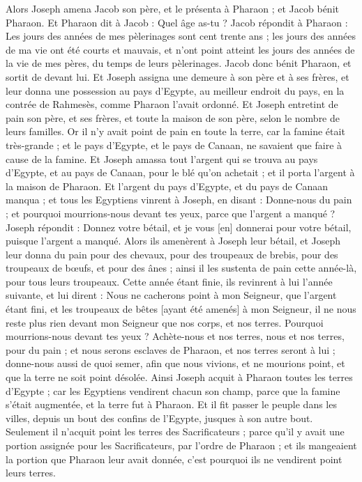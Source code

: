 \begin{multicols}{2}
Alors Joseph amena Jacob son père, et le présenta à Pharaon ; et Jacob bénit Pharaon.
Et Pharaon dit à Jacob : Quel âge as-tu ?
Jacob répondit à Pharaon : Les jours des années de mes pèlerinages sont cent trente ans ; les jours des années de ma vie ont été courts et mauvais, et n'ont point atteint les jours des années de la vie de mes pères, du temps de leurs pèlerinages.
Jacob donc bénit Pharaon, et sortit de devant lui.
Et Joseph assigna une demeure à son père et à ses frères, et leur donna une possession au pays d'Egypte, au meilleur endroit du pays, en la contrée de Rahmesès, comme Pharaon l'avait ordonné.
Et Joseph entretint de pain son père, et ses frères, et toute la maison de son père, selon le nombre de leurs familles.
Or il n'y avait point de pain en toute la terre, car la famine était très-grande ; et le pays d'Egypte, et le pays de Canaan, ne savaient que faire à cause de la famine.
Et Joseph amassa tout l'argent qui se trouva au pays d'Egypte, et au pays de Canaan, pour le blé qu'on achetait ; et il porta l'argent à la maison de Pharaon.
Et l'argent du pays d'Egypte, et du pays de Canaan manqua ; et tous les Egyptiens vinrent à Joseph, en disant : Donne-nous du pain ; et pourquoi mourrions-nous devant tes yeux, parce que l'argent a manqué ?
Joseph répondit : Donnez votre bétail, et je vous [en] donnerai pour votre bétail, puisque l'argent a manqué.
Alors ils amenèrent à Joseph leur bétail, et Joseph leur donna du pain pour des chevaux, pour des troupeaux de brebis, pour des troupeaux de bœufs, et pour des ânes ; ainsi il les sustenta de pain cette année-là, pour tous leurs troupeaux.
Cette année étant finie, ils revinrent à lui l'année suivante, et lui dirent : Nous ne cacherons point à mon Seigneur, que l'argent étant fini, et les troupeaux de bêtes [ayant été amenés] à mon Seigneur, il ne nous reste plus rien devant mon Seigneur que nos corps, et nos terres.
Pourquoi mourrions-nous devant tes yeux ? Achète-nous et nos terres, nous et nos terres, pour du pain ; et nous serons esclaves de Pharaon, et nos terres seront à lui ; donne-nous aussi de quoi semer, afin que nous vivions, et ne mourions point, et que la terre ne soit point désolée.
Ainsi Joseph acquit à Pharaon toutes les terres d'Egypte ; car les Egyptiens vendirent chacun son champ, parce que la famine s'était augmentée, et la terre fut à Pharaon.
Et il fit passer le peuple dans les villes, depuis un bout des confins de l'Egypte, jusques à son autre bout.
Seulement il n'acquit point les terres des Sacrificateurs ; parce qu'il y avait une portion assignée pour les Sacrificateurs, par l'ordre de Pharaon ; et ils mangeaient la portion que Pharaon leur avait donnée, c'est pourquoi ils ne vendirent point leurs terres.

\end{multicols}
